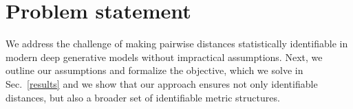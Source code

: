 \section{Problem statement}
\label{sec:problem_statement}
We address the challenge of making pairwise distances statistically identifiable in modern deep generative models without impractical assumptions. Next, we outline our assumptions and formalize the objective, which we solve in Sec.~\ref{results} and we show that our approach ensures not only identifiable distances, but also a broader set of identifiable metric structures.




